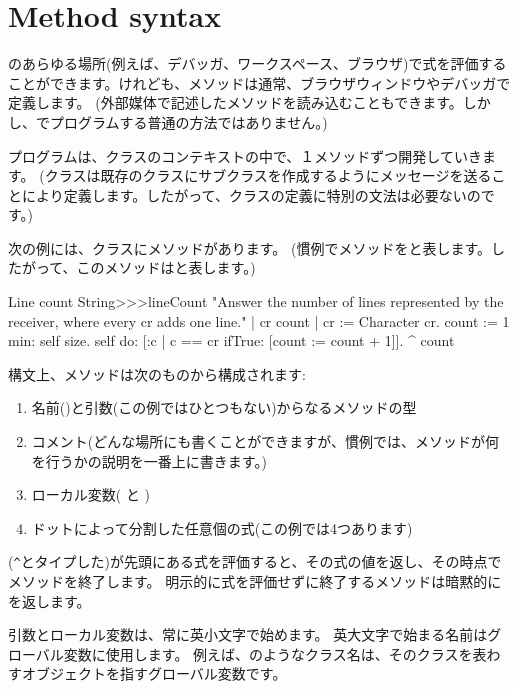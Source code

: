 \documentclass[a4paper,10pt,twoside]{book}
\begin{document}
\section{Method syntax}

\pharo のあらゆる場所(例えば、デバッガ、ワークスペース、ブラウザ)で式を評価することができます。けれども、メソッドは通常、ブラウザウィンドウやデバッガで定義します。
(外部媒体で記述したメソッドを読み込むこともできます。しかし、\pharo でプログラムする普通の方法ではありません。)

プログラムは、クラスのコンテキストの中で、１メソッドずつ開発していきます。
(クラスは既存のクラスにサブクラスを作成するようにメッセージを送ることにより定義します。したがって、クラスの定義に特別の文法は必要ないのです。)

次の例には、クラスにメソッドがあります。
(慣例でメソッドをと表します。したがって、このメソッドはと表します。)

\begin{method}[lineCount]{Line count}
String>>>lineCount
   "Answer the number of lines represented by the receiver,
   where every cr adds one line."
   | cr count |
   cr := Character cr.
   count := 1 min: self size.
   self do:
      [:c | c == cr ifTrue: [count := count + 1]].
   ^ count
\end{method}

構文上、メソッドは次のものから構成されます:
\begin{enumerate}
  \item 名前(\ie {})と引数(この例ではひとつもない)からなるメソッドの型
  \item コメント(どんな場所にも書くことができますが、慣例では、メソッドが何を行うかの説明を一番上に書きます。)
  \item ローカル変数(\ie {} と )
  \item ドットによって分割した任意個の式(この例では4つあります)
\end{enumerate}

\ct{^}(\verb|^|とタイプした)が先頭にある式を評価すると、その式の値を返し、その時点でメソッドを終了します。
明示的に式を評価せずに終了するメソッドは暗黙的にを返します。

引数とローカル変数は、常に英小文字で始めます。
英大文字で始まる名前はグローバル変数に使用します。
例えば、のようなクラス名は、そのクラスを表わすオブジェクトを指すグローバル変数です。
\end{document}
